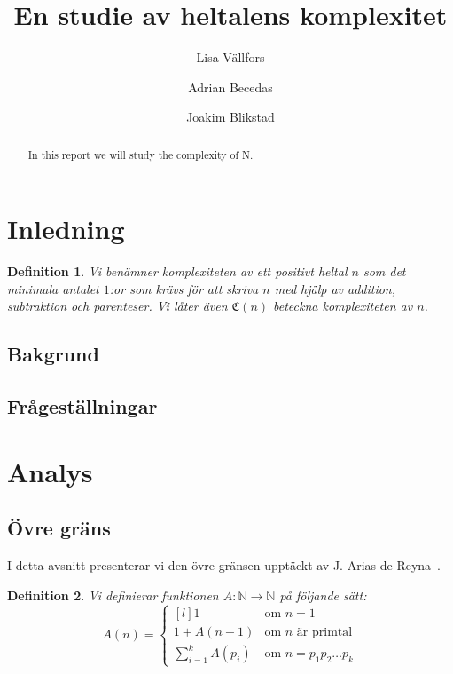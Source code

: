 \documentclass[a4paper,titlepage,draft]{article}
\title{En studie av heltalens komplexitet}
\author{Lisa Vällfors \and Adrian Becedas \and Joakim Blikstad}
\newcommand{\N}{\mathbb{N}}
\newcommand{\C}[1]{\mathfrak C \left( #1 \right)}
\newtheorem{definition}{Definition}
\begin{document}
\maketitle

\begin{abstract}
    In this report we will study the complexity of N.
\end{abstract}

\tableofcontents 
\newpage

\section{Inledning}

    \begin{definition}
       Vi benämner komplexiteten av ett positivt heltal $n$ som det minimala
       antalet $1$:or som krävs för att skriva $n$ med hjälp av addition,
       subtraktion och parenteser. Vi låter även $\C{n}$ beteckna komplexiteten av
       $n$. 
    \end{definition}

    \subsection{Bakgrund}

    \subsection{Frågeställningar}


\section{Analys}

    \subsection{Övre gräns}

    I detta avsnitt presenterar vi den övre gränsen upptäckt av J. Arias de
    Reyna~\citep{spansk}.
    \begin{definition}
        Vi definierar funktionen $A:\N\to\N$ på följande sätt:
        $$ A(n) = \left\{ \begin{matrix*}[l] 1 & \text{om } n=1 \\ 1+A(n-1) & \text{om $n$ är primtal} \\ \sum_{i=1}^kA(p_i) & \text{om } n=p_1p_2 \ldots p_k \end{matrix*} \right. $$
    \end{definition}
\end{document}
